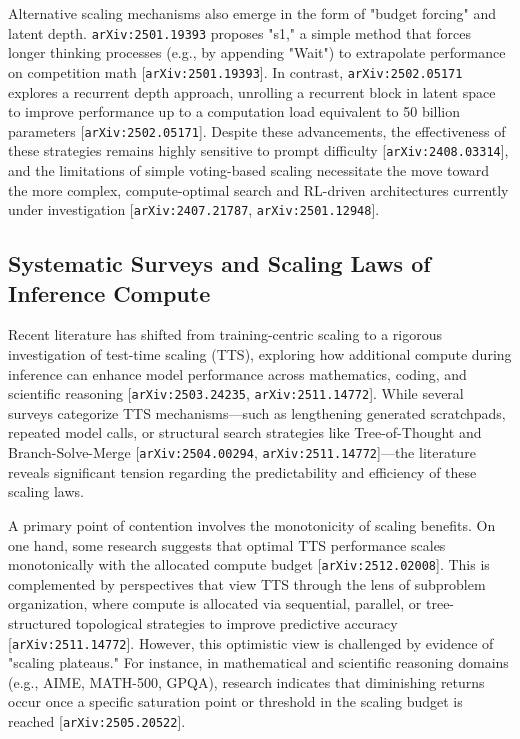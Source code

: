 \documentclass[11pt]{article}
\begin{document}
Alternative scaling mechanisms also emerge in the form of "budget forcing" and latent depth. \texttt{arXiv:2501.19393} proposes "s1," a simple method that forces longer thinking processes (e.g., by appending "Wait") to extrapolate performance on competition math [\texttt{arXiv:2501.19393}]. In contrast, \texttt{arXiv:2502.05171} explores a recurrent depth approach, unrolling a recurrent block in latent space to improve performance up to a computation load equivalent to 50 billion parameters [\texttt{arXiv:2502.05171}]. Despite these advancements, the effectiveness of these strategies remains highly sensitive to prompt difficulty [\texttt{arXiv:2408.03314}], and the limitations of simple voting-based scaling necessitate the move toward the more complex, compute-optimal search and RL-driven architectures currently under investigation [\texttt{arXiv:2407.21787}, \texttt{arXiv:2501.12948}].

\subsection{Systematic Surveys and Scaling Laws of Inference Compute}

Recent literature has shifted from training-centric scaling to a rigorous investigation of test-time scaling (TTS), exploring how additional compute during inference can enhance model performance across mathematics, coding, and scientific reasoning [\texttt{arXiv:2503.24235}, \texttt{arXiv:2511.14772}]. While several surveys categorize TTS mechanisms—such as lengthening generated scratchpads, repeated model calls, or structural search strategies like Tree-of-Thought and Branch-Solve-Merge [\texttt{arXiv:2504.00294}, \texttt{arXiv:2511.14772}]—the literature reveals significant tension regarding the predictability and efficiency of these scaling laws.

A primary point of contention involves the monotonicity of scaling benefits. On one hand, some research suggests that optimal TTS performance scales monotonically with the allocated compute budget [\texttt{arXiv:2512.02008}]. This is complemented by perspectives that view TTS through the lens of subproblem organization, where compute is allocated via sequential, parallel, or tree-structured topological strategies to improve predictive accuracy [\texttt{arXiv:2511.14772}]. However, this optimistic view is challenged by evidence of "scaling plateaus." For instance, in mathematical and scientific reasoning domains (e.g., AIME, MATH-500, GPQA), research indicates that diminishing returns occur once a specific saturation point or threshold in the scaling budget is reached [\texttt{arXiv:2505.20522}].
\end{document}
